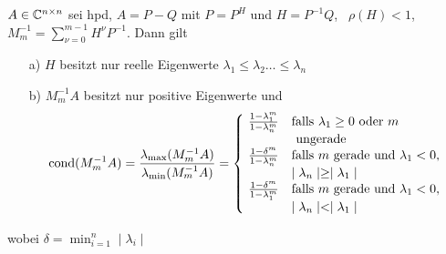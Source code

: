 \begin{lem} \label{prae_kond_lem}\label{S468}
$ A \in \mathbb{C}^{n \times n} $ sei hpd, $ A = P - Q $ mit $ P = P^H $ und $ H =
P^{-1} Q $, \, $ \rho (H) < 1 $, \, $ M_m^{-1} = \displaystyle{\sum_{\nu=0}^{m-1}}
H^\nu P^{-1}$. Dann gilt
\begin{itemize}
\item[a)] $H$ besitzt nur reelle Eigenwerte $ \lambda_1 \leq \lambda_2 \ldots \leq \lambda_n $
\item[b)] $ M_m^{-1} A $ besitzt nur positive Eigenwerte und
\[
\operatorname{cond} (M_m^{-1} A) = \frac{\lambda_{\max} (M_m^{-1} A)}{\lambda_{\min}
(M_m^{-1} A ) }= \left\{\!
\begin{array}{ll}
\frac{1 - \lambda_1^m}{1 - \lambda_n^m} & \mbox{falls } \lambda_1 \geq 0
\mbox{ oder } m\\
& \mbox{ ungerade} \\
\frac{1 - \delta^m}{1 - \lambda_n^m} & \mbox{falls }  m \mbox{ gerade} \mbox{
und }  \lambda_1 < 0 , \\
& \mid \lambda_n \mid \geq \mid \lambda_1 \mid \\
\frac{1 - \delta^m}{1 - \lambda_1^m} & \mbox{falls }  m \mbox{ gerade} \mbox{
und }  \lambda_1 < 0 , \\
& \mid \lambda_n \mid < \mid \lambda_1 \mid
\end{array} \right.
\]
\end{itemize}
wobei $ \delta = \displaystyle{\min_{i=1}^n} \mid \lambda_i \mid $
\end{lem}
